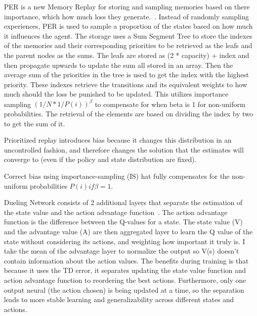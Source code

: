 \documentclass{article}
\begin{document}
PER is a new Memory Replay for storing and sampling memories based on there importance, which how much loss they generate.~\cite{schaul_prioritized_2016}.
Instead of randomly sampling experiences, PER is used to sample a proportion of the states based on how much it influences the agent.
The storage uses a Sum Segment Tree to store the indexes of the memories and their corresponding priorities to be retrieved as the leafs and the parent nodes as the sums.
The leafs are stored as (2 * capacity) + index and then propagate upwards to update the sum all stored in an array.
Then the average sum of the priorities in the tree is used to get the index with the highest priority.
These indexes retrieve the transitions and its equivalent weights to how much should the loss be punished to be updated.
This utilizes importance sampling \((1/N * 1/P(i))^{\beta}\) to compensate for when beta is 1 for non-uniform probabilities.
The retrieval of the elements are based on dividing the index by two to get the sum of it.

Prioritized replay introduces bias because it changes this
distribution in an uncontrolled fashion, and therefore changes the solution that the estimates will
converge to (even if the policy and state distribution are fixed). 

Correct bias using importance-sampling (IS) 
hat fully compensates for the non-uniform probabilities \(P(i) if \beta = 1\). 

Dueling Network consists of 2 additional layers that separate the estimation of the state value and the action advantage function~\cite{wang_dueling_2016}.
The action advantage function is the difference between the Q-values for a state.
The state value (V) and the advantage value (A) are then aggregated layer to learn the Q value of the state without considering its actions, and weighting how important it truly is.
I take the mean of the advantage layer to normalize the output so V(s) doesn't contain information about the action values.
The benefits during training is that because it uses the TD error, it separates updating the state value function and action advantage function to reordering the best actions.
Furthermore, only one output neural (the action chosen) is being updated at a time, so the separation leads to more stable learning and generalizability across different states and actions.
\end{document}
